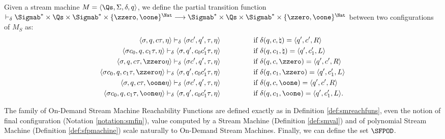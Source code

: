 \begin{defn}
  \label{def:smodtransfun}
Given a stream machine $M=\langle \Qs,
\Sigma, \delta, q\rangle$,
we define the partial transition function
$\vdash_{\delta} \Sigmab^* \times \Qs
\times \Sigmab^* \times \{\zzero,
\oone\}^{\Nat} \longrightarrow \Sigmab^*
\times \Qs \times \Sigmab^* \times \{\zzero,
\oone\}^{\Nat}$
between two configurations of $M_S$ as:
%
\begin{align*}
  \langle \sigma, q, c\tau, \eta\rangle
  \vdash_{\delta} \langle\sigma c', q', \tau, \eta\rangle
  \ \ \ \ \ \ \ \ \ \ \ \ \ &\text{ if }
  \delta (q,c,\natural)
  = \langle q',c',R\rangle
  \\
  \langle \sigma c_0, q, c_1\tau,\eta\rangle
  \vdash_{\delta} \langle \sigma, q', c_0c_1'\tau,
  \eta\rangle
   \ \ \ \ \ \ \ \ \ \ \ \ \ &\text{ if }
  \delta (q, c_1,\natural)
  = \langle q', c_1', L\rangle  \\
  \langle \sigma, q, c\tau, \zzero \eta\rangle
  \vdash_{\delta} \langle\sigma c', q', \tau, \eta\rangle
  \ \ \ \ \ \ \ \ \ \ \ \ \ &\text{ if }
  \delta (q,c,\zzero)
  = \langle q',c',R\rangle
  \\
  \langle \sigma c_0, q, c_1\tau, \zzero
  \eta\rangle
  \vdash_{\delta} \langle \sigma, q', c_0c_1'\tau,
  \eta\rangle
   \ \ \ \ \ \ \ \ \ \ \ \ \ &\text{ if }
  \delta (q, c_1,\zzero)
  = \langle q', c_1', L\rangle  \\
  \langle \sigma, q, c\tau, \oone \eta\rangle
  \vdash_{\delta}
  \langle \sigma c', q', \tau, \eta\rangle
   \ \ \ \ \ \ \ \ \ \ \ \ \ &\text{ if }
   \delta(q, c, \oone)=
   \langle q', c', R\rangle \\
   \langle \sigma c_0, q, c_1\tau,
   \oone\eta\rangle
   \vdash_{\delta} \langle \sigma,
   q', c_0c_1' \tau, \eta \rangle
    \ \ \ \ \ \ \ \ \ \ \ \ \ &\text{ if }
   \delta(q, c_1,\oone)
   = \langle q',c_1', L\rangle.
\end{align*}
\end{defn}

The family of On-Demand Stream Machine Reachability Functions are defined
exactly as in Definition \ref{def:smreachfuns}, even the notion of
final configuration (Notation \ref{notation:smfin}),
value computed by a Stream Machine (Definition \ref{def:smval}) and of
polynomial Stream Machine (Definition \ref{def:sfpmachine}) scale naturally to
On-Demand Stream Machines.
%
Finally, we can define the set $\SFPOD$.

